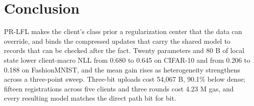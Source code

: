 \section{Conclusion}
PR-LFL makes the client's class prior a regularization center that the data can override, and binds the compressed updates that carry the shared model to records that can be checked after the fact. Twenty parameters and 80 B of local state lower client-macro NLL from 0.680 to 0.645 on CIFAR-10 and from 0.206 to 0.188 on FashionMNIST, and the mean gain rises as heterogeneity strengthens across a three-point sweep. Three-bit uploads cost 54,067 B, 90.1\% below dense; fifteen registrations across five clients and three rounds cost 4.23 M gas, and every resulting model matches the direct path bit for bit.

